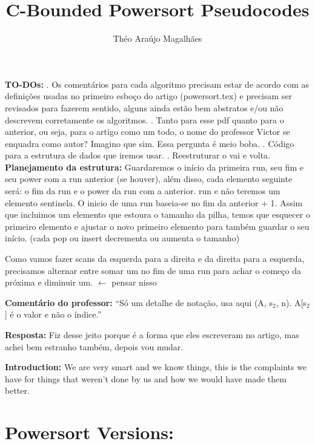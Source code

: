 \documentclass{article}
\title{\textbf{C-Bounded Powersort Pseudocodes}}
\author{Théo Araújo Magalhães}
\begin{document}
\maketitle
\noindent\textbf{TO-DOs:} \newline
{}. Os comentários para cada algoritmo precisam estar de acordo com as definições usadas
no primeiro esboço do artigo (powersort.tex) e precisam ser revisados para fazerem
sentido, alguns ainda estão bem abstratos e/ou não descrevem corretamente os algoritmos. \newline
{}. Tanto para esse pdf quanto para o anterior, ou seja, para o artigo como um todo, o nome do professor Victor se enquadra como autor? Imagino que sim.
Essa pergunta é meio boba. \newline
{}. Código para a estrutura de dados que iremos usar. \newline
{}. Reestruturar o vai e volta. \newline
\noindent\textbf{Planejamento da estrutura:} Guardaremos o início da primeira run, seu fim e seu power com a run anterior (se houver), além disso,
cada elemento seguinte será: o fim da run e o power da run com a anterior. 
run e não teremos um elemento sentinela. O inicio de uma run baseia-se no fim da anterior + 1. Assim que incluimos um elemento
que estoura o tamanho da pilha, temos que esquecer o primeiro elemento e ajustar
o novo primeiro elemento para também guardar o seu início.
(cada pop ou insert decrementa ou aumenta o tamanho) 

\noindent Como vamos fazer scans da esquerda para a direita e da direita para a esquerda, precisamos 
alternar entre somar um no fim de uma run para achar o começo da próxima e diminuir um. $\gets$ pensar nisso

\noindent \textbf{Comentário do professor:} ``{Só um detalhe de notação, usa aqui (A, s$_2$, n). A[s$_2$] é o valor e não o índice.}''

\noindent \textbf{Resposta:} Fiz desse jeito porque é a forma que eles escreveram no artigo, mas achei bem estranho também, depois vou mudar.



\noindent \textbf{Introduction:} We are very smart and we know things, this is the complaints we have for things
that weren't done by us and how we would have made them better. 
\newpage
\section{Powersort Versions:}
\end{document}
